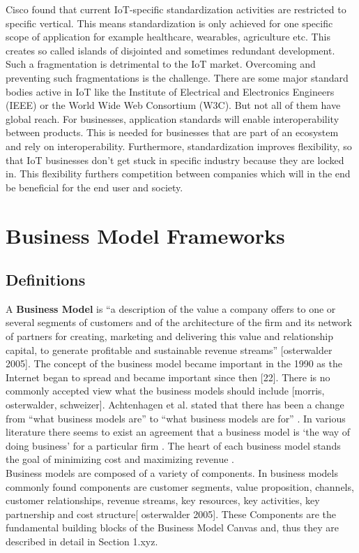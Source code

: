 		Cisco found that current IoT-specific standardization activities are restricted to specific vertical. This means standardization is only achieved for one specific scope of application for example healthcare, wearables, agriculture etc. This creates so called islands of disjointed and sometimes redundant development.
		Such a fragmentation is detrimental to the IoT market. Overcoming and preventing such fragmentations is the challenge. There are some major standard bodies active in IoT like the Institute of Electrical and Electronics Engineers (IEEE) or the World Wide Web Consortium (W3C). But not all of them have global reach.
		For businesses, application standards will enable interoperability between products.  This is needed for businesses that are part of an ecosystem and rely on interoperability. Furthermore, standardization improves flexibility, so that IoT businesses don't get stuck in specific industry because they are locked in. This flexibility furthers competition between companies which will in the end be beneficial for the end user and society.

\section{Business Model Frameworks}
	
	\subsection{Definitions}
		 A \textbf{Business Model} is ``a description of the value a company offers to one or several segments of customers and of the architecture of the firm and its network of partners for creating, marketing and delivering this value and relationship capital, to generate profitable and sustainable revenue streams'' [osterwalder 2005]. The concept of the business model became important in the 1990 as the Internet began to spread and became important since then [22]. There is no commonly accepted view what the business models should include [morris, osterwalder, schweizer]. Achtenhagen et al. stated that there has been a change from ``what business models are'' to ``what business models are for'' \cite{westerlund}. In various literature there seems to exist an agreement that a business model is `the way of doing business' for a particular firm \cite{westerlund}. The heart of each business model stands the goal of minimizing cost and maximizing revenue \cite{ju}.\\
		 Business models are composed of a variety of components. In business models commonly found components are customer segments, value proposition, channels, customer relationships, revenue streams, key resources, key activities, key partnership and cost structure[ osterwalder 2005]. These Components are the fundamental building blocks of the Business Model Canvas and, thus they are described in detail in Section 1.xyz. \\

